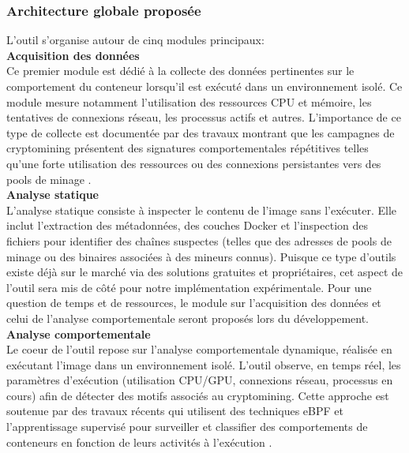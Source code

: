 \subsubsection{Architecture globale proposée}
L'outil s'organise autour de cinq modules principaux: \\
\newline
\textbf{Acquisition des données} \\
\newline
Ce premier module est dédié à la collecte des données pertinentes sur le comportement du conteneur lorsqu'il est exécuté dans un environnement isolé. Ce module mesure notamment l'utilisation des ressources CPU et mémoire, les tentatives de connexions réseau, les processus actifs et autres. L'importance de ce type de collecte est documentée par des travaux montrant que les campagnes de cryptomining présentent des signatures comportementales répétitives telles qu'une forte utilisation des ressources ou des connexions persistantes vers des pools de minage \cite{kaspersky2022cryptojacking} \cite{enisa2021threatlandscape} \cite{kim2025ebpf} \cite{hackernews2024docker}. \\
\newline
\textbf{Analyse statique} \\
\newline
L'analyse statique consiste à inspecter le contenu de l'image sans l'exécuter. Elle inclut l'extraction des métadonnées, des couches Docker et l'inspection des fichiers pour identifier des chaînes suspectes (telles que des adresses de pools de minage ou des binaires associées à des mineurs connus). Puisque ce type d'outils existe déjà sur le marché via des solutions gratuites et propriétaires, cet aspect de l'outil sera mis de côté pour notre implémentation expérimentale. Pour une question de temps et de ressources, le module sur l'acquisition des données et celui de l'analyse comportementale seront proposés lors du développement. \\
\newline
\textbf{Analyse comportementale} \\
\newline
Le coeur de l'outil repose sur l'analyse comportementale dynamique, réalisée en exécutant l'image dans un environnement isolé. L'outil observe, en temps réel, les paramètres d'exécution (utilisation CPU/GPU, connexions réseau, processus en cours) afin de détecter des motifs associés au cryptomining. Cette approche est soutenue par des travaux récents qui utilisent des techniques eBPF et l'apprentissage supervisé pour surveiller et classifier des comportements de conteneurs en fonction de leurs activités à l'exécution \cite{kim2025ebpf}. \\
